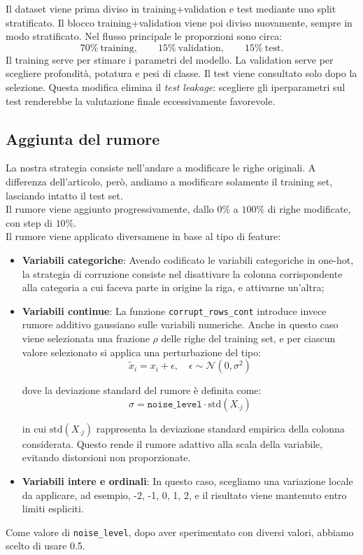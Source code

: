 \documentclass{article}
\begin{document}
Il dataset viene prima diviso in training+validation e test mediante uno split stratificato. Il blocco training+validation viene poi diviso nuovamente, sempre in modo stratificato. Nel flusso principale le proporzioni sono circa:
\[
70\%\ \text{training}, \qquad 15\%\ \text{validation}, \qquad 15\%\ \text{test}.
\]
Il training serve per stimare i parametri del modello. La validation serve per scegliere profondità, potatura e pesi di classe. Il test viene consultato solo dopo la selezione. Questa modifica elimina il \textit{test leakage}: scegliere gli iperparametri sul test renderebbe la valutazione finale eccessivamente favorevole.

\newpage

\subsection{Aggiunta del rumore}
La nostra strategia consiste nell'andare a modificare le righe originali. A differenza dell'articolo, però, andiamo a modificare solamente il training set, lasciando intatto il test set.\\
Il rumore viene aggiunto progressivamente, dallo $0\%$ a $100\%$ di righe modificate, con step di $10\%$.\\
Il rumore viene applicato diversamene in base al tipo di feature:
\begin{itemize}

    \item \textbf{Variabili categoriche}: 
    Avendo codificato le variabili categoriche in one-hot, la strategia di corruzione consiste nel disattivare la colonna corrispondente alla categoria a cui faceva parte in origine la riga, e attivarne un’altra;
        \item \textbf{Variabili continue}: 
    La funzione \texttt{corrupt\_rows\_cont} introduce invece rumore additivo gaussiano sulle variabili numeriche. Anche in questo caso viene selezionata una frazione \( \rho \) delle righe del training set, e per ciascun valore selezionato si applica una perturbazione del tipo:
    \[
    \tilde{x}_i = x_i + \epsilon, \quad \epsilon \sim \mathcal{N}(0, \sigma^2)
    \]
    
    dove la deviazione standard del rumore è definita come:
    \[
    \sigma = \texttt{noise\_level} \cdot \mathrm{std}(X_{\cdot j})
    \]
    
    in cui \( \mathrm{std}(X_{\cdot j}) \) rappresenta la deviazione standard empirica della colonna considerata. Questo rende il rumore adattivo alla scala della variabile, evitando distorsioni non proporzionate.
    \item \textbf{Variabili intere e ordinali}:  In questo caso, scegliamo una variazione locale da applicare, ad esempio, -2, -1, 0, 1, 2, e il risultato viene mantenuto entro limiti espliciti.
\end{itemize}
    Come valore di \texttt{noise\_level}, dopo aver sperimentato con diversi valori, abbiamo scelto di usare 0.5.
\end{document}

